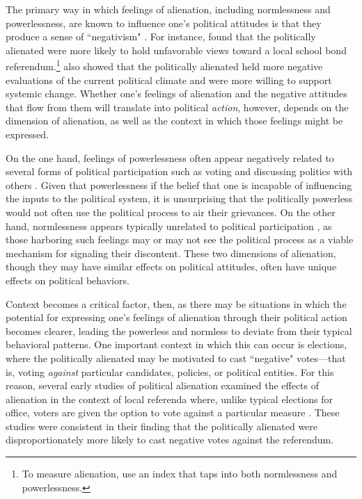 \documentclass[12pt]{article}
\begin{document}
The primary way in which feelings of alienation, including normlessness and powerlessness, are known to influence one's political attitudes is that they produce a sense of ``negativism" \parencite{horton1962powerlessness}. For instance, \textcite{thompson1960} found that the politically alienated were more likely to hold unfavorable views toward a local school bond referendum.\footnote{To measure alienation, \textcite{thompson1960} use an index that taps into both normlessness and powerlessness.} \textcite{citrin1975} also showed that the politically alienated held more negative evaluations of the current political climate and were more willing to support systemic change. Whether one's feelings of alienation and the negative attitudes that flow from them will translate into political \textit{action}, however, depends on the dimension of alienation, as well as the context in which those feelings might be expressed. 

On the one hand, feelings of powerlessness often appear negatively related to several forms of political participation such as voting \parencite{horton1962powerlessness,aberbach1969alienation} and discussing politics with others \parencite{olsen1969,finifter1970dimensions}. Given that powerlessness if the belief that one is incapable of influencing the inputs to the political system, it is unsurprising that the politically powerless would not often use the political process to air their grievances. On the other hand, normlessness appears typically unrelated to political participation \parencite{finifter1970dimensions,olsen1969}, as those harboring such feelings may or may not see the political process as a viable mechanism for signaling their discontent. These two dimensions of alienation, though they may have similar effects on political attitudes, often have unique effects on political behaviors. 

Context becomes a critical factor, then, as there may be situations in which the potential for expressing one's feelings of alienation through their political action becomes clearer, leading the powerless and normless to deviate from their typical behavioral patterns. One important context in which this can occur is elections, where the politically alienated may be motivated to cast ``negative" votes---that is, voting \textit{against} particular candidates, policies, or political entities. For this reason, several early studies of political alienation examined the effects of alienation in the context of local referenda where, unlike typical elections for office, voters are given the option to vote against a particular measure \parencite{mcdill1962status,horton1962powerlessness,thompson1960}. These studies were consistent in their finding that the politically alienated were disproportionately more likely to cast negative votes against the referendum.
\end{document}
